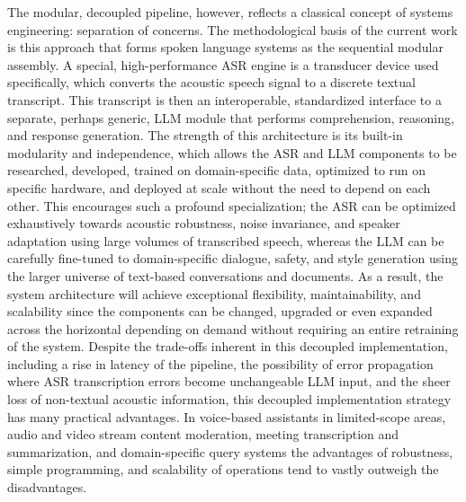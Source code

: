 The modular, decoupled pipeline, however, reflects a classical concept of systems engineering: separation of concerns. The methodological basis of the current work is this approach that forms spoken language systems as the sequential modular assembly. A special, high-performance ASR engine is a transducer device used specifically, which converts the acoustic speech signal to a discrete textual transcript. This transcript is then an interoperable, standardized interface to a separate, perhaps generic, LLM module that performs comprehension, reasoning, and response generation. The strength of this architecture is its built-in modularity and independence, which allows the ASR and LLM components to be researched, developed, trained on domain-specific data, optimized to run on specific hardware, and deployed at scale without the need to depend on each other. This encourages such a profound specialization; the ASR can be optimized exhaustively towards acoustic robustness, noise invariance, and speaker adaptation using large volumes of transcribed speech, whereas the LLM can be carefully fine-tuned to domain-specific dialogue, safety, and style generation using the larger universe of text-based conversations and documents. As a result, the system architecture will achieve exceptional flexibility, maintainability, and scalability since the components can be changed, upgraded or even expanded across the horizontal depending on demand without requiring an entire retraining of the system. Despite the trade-offs inherent in this decoupled implementation, including a rise in latency of the pipeline, the possibility of error propagation where ASR transcription errors become unchangeable LLM input, and the sheer loss of non-textual acoustic information, this decoupled implementation strategy has many practical advantages. In voice-based assistants in limited-scope areas, audio and video stream content moderation, meeting transcription and summarization, and domain-specific query systems the advantages of robustness, simple programming, and scalability of operations tend to vastly outweigh the disadvantages.

